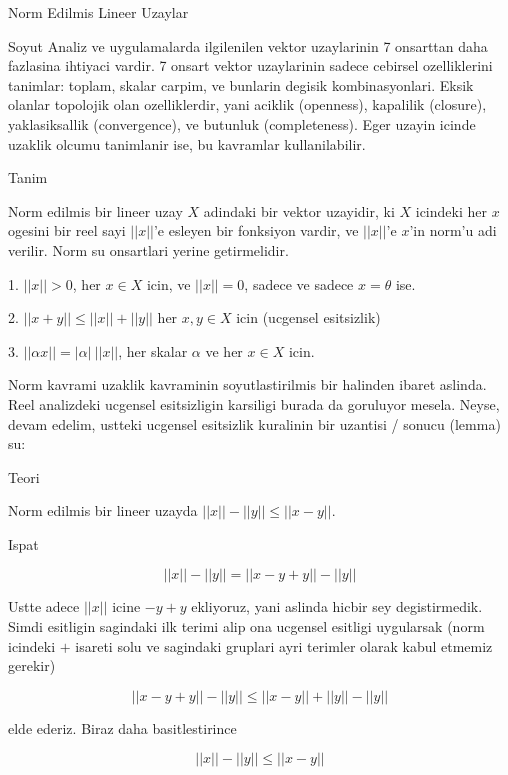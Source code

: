 \documentclass[12pt,fleqn]{article}
\begin{document}
Norm Edilmis Lineer Uzaylar

Soyut Analiz ve uygulamalarda ilgilenilen vektor uzaylarinin 7 onsarttan
daha fazlasina ihtiyaci vardir. 7 onsart vektor uzaylarinin sadece cebirsel
ozelliklerini tanimlar: toplam, skalar carpim, ve bunlarin degisik
kombinasyonlari. Eksik olanlar topolojik olan ozelliklerdir, yani aciklik
(openness), kapalilik (closure), yaklasiksallik (convergence), ve butunluk
(completeness). Eger uzayin icinde uzaklik olcumu tanimlanir ise, bu
kavramlar kullanilabilir. 

Tanim

Norm edilmis bir lineer uzay $X$ adindaki bir vektor uzayidir, ki $X$
icindeki her $x$ ogesini bir reel sayi $||x||$'e esleyen bir fonksiyon
vardir, ve $||x||$'e $x$'in norm'u adi verilir. Norm su onsartlari yerine
getirmelidir. 

1. $||x|| > 0$, her $x \in X$ icin, ve $||x|| = 0$, sadece ve sadece $x =
\theta$ ise. 

2. $||x+y|| \le ||x|| + ||y||$ her $x,y \in X$ icin (ucgensel esitsizlik) 

3. $||\alpha x|| = |\alpha| \ ||x||$, her skalar $\alpha$ ve her $x \in X$ icin. 

Norm kavrami uzaklik kavraminin soyutlastirilmis bir halinden ibaret
aslinda. Reel analizdeki ucgensel esitsizligin karsiligi burada da
goruluyor mesela. Neyse, devam edelim, ustteki ucgensel esitsizlik
kuralinin bir uzantisi / sonucu (lemma) su:

Teori 

Norm edilmis bir lineer uzayda $||x|| - ||y|| \le ||x-y||$. 

Ispat

\[ ||x|| - ||y|| = ||x - y + y|| - ||y||\]

Ustte adece $||x||$ icine $-y+y$ ekliyoruz, yani aslinda hicbir sey
degistirmedik. Simdi esitligin sagindaki ilk terimi alip ona ucgensel
esitligi uygularsak (norm icindeki $+$ isareti solu ve sagindaki gruplari
ayri terimler olarak kabul etmemiz gerekir)

\[ ||x - y + y|| - ||y|| \le
||x - y || + ||y|| - ||y|| 
\]

elde ederiz. Biraz daha basitlestirince

\[ ||x|| - ||y||  \le ||x - y ||  \]
\end{document}
